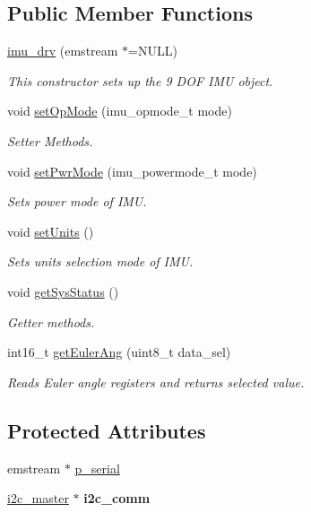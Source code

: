 \subsection*{Public Member Functions}
\begin{DoxyCompactItemize}
\item 
\hyperlink{classimu__drv_a9b97840e6d0ee2a9543cdff67697df09}{imu\-\_\-drv} (emstream $\ast$=N\-U\-L\-L)
\begin{DoxyCompactList}\small\item\em This constructor sets up the 9 D\-O\-F I\-M\-U object. \end{DoxyCompactList}\item 
void \hyperlink{classimu__drv_a8bbc49938744a5d414ec82e5a80e8bcb}{set\-Op\-Mode} (imu\-\_\-opmode\-\_\-t mode)
\begin{DoxyCompactList}\small\item\em Setter Methods. \end{DoxyCompactList}\item 
void \hyperlink{classimu__drv_a3e4f164746a37af9cc2f4964140df71e}{set\-Pwr\-Mode} (imu\-\_\-powermode\-\_\-t mode)
\begin{DoxyCompactList}\small\item\em Sets power mode of I\-M\-U. \end{DoxyCompactList}\item 
void \hyperlink{classimu__drv_a481dd40cd689e1e9ca579bd8fd9224fc}{set\-Units} ()
\begin{DoxyCompactList}\small\item\em Sets units selection mode of I\-M\-U. \end{DoxyCompactList}\item 
void \hyperlink{classimu__drv_ab64eedbc7b14cfe209c384c767cdf54b}{get\-Sys\-Status} ()
\begin{DoxyCompactList}\small\item\em Getter methods. \end{DoxyCompactList}\item 
int16\-\_\-t \hyperlink{classimu__drv_a5f39425d0876c45c9f166eef7ff169cc}{get\-Euler\-Ang} (uint8\-\_\-t data\-\_\-sel)
\begin{DoxyCompactList}\small\item\em Reads Euler angle registers and returns selected value. \end{DoxyCompactList}\end{DoxyCompactItemize}
\subsection*{Protected Attributes}
\begin{DoxyCompactItemize}
\item 
emstream $\ast$ \hyperlink{classimu__drv_af7914a964b1f1fc98f0c7f505fc6d062}{p\-\_\-serial}
\item 
\hypertarget{classimu__drv_ad901d6b16ce55906dc13b615b5c68925}{\hyperlink{classi2c__master}{i2c\-\_\-master} $\ast$ {\bfseries i2c\-\_\-comm}}\label{classimu__drv_ad901d6b16ce55906dc13b615b5c68925}

\end{DoxyCompactItemize}


